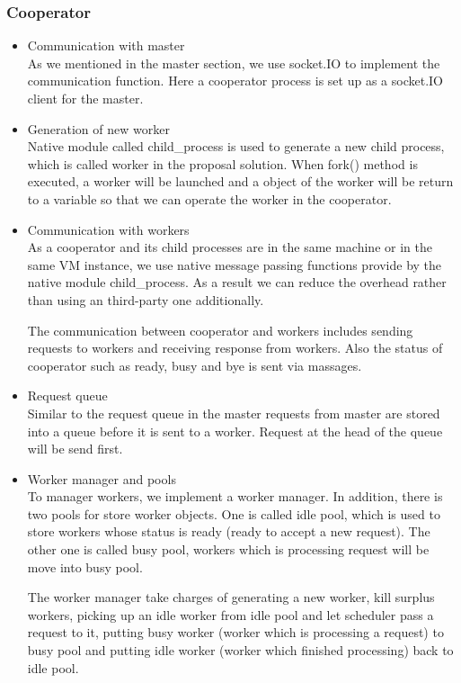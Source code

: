 \documentclass[JIP]{ipsj}
\begin{document}
\subsubsection{Cooperator}
\begin{itemize}
	\item Communication with master\\
	As we mentioned in the master section, we use socket.IO to implement the communication function. Here a cooperator process is set up as a socket.IO client for the master.

	\item Generation of new worker\\
	Native module called child\_process is used to generate a new child process, which is called worker in the proposal solution. When fork() method is executed, a worker will be launched and a object of the worker will be return to a variable so that we can operate the worker in the cooperator.

	\item Communication with workers\\
	As a cooperator and its child processes are in the same machine or in the same VM instance, we use native message passing functions provide by the native module child\_process. As a result we can reduce the overhead rather than using an third-party one additionally.

	The communication between cooperator and workers includes sending requests to workers and receiving response from workers. Also the status of cooperator such as ready, busy and bye is sent via massages.

	\item Request queue\\
	Similar to the request queue in the master requests from master are stored into a queue before it is sent to a worker. Request at the head of the queue will be send first.

	\item Worker manager and pools\\
	To manager workers, we implement a worker manager. In addition, there is two pools for store worker objects. One is called idle pool, which is used to store workers whose status is ready (ready to accept a new request). The other one is called busy pool, workers which is processing request will be move into busy pool.

	The worker manager take charges of generating a new worker, kill surplus workers, picking up an idle worker from idle pool and let scheduler pass a request to it, putting busy worker (worker which is processing a request) to busy pool and putting idle worker (worker which finished processing) back to idle pool.


\end{itemize}
\end{document}
